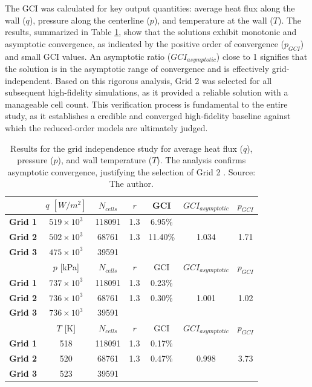 \documentclass[tg, EN]{ufabcFHZh_tg}
\begin{document}
The GCI was calculated for key output quantities: average heat flux along the wall ($q$), pressure along the centerline ($p$), and temperature at the wall ($T$). The results, summarized in Table \ref{tab:grid_independence_results}, show that the solutions exhibit monotonic and asymptotic convergence, as indicated by the positive order of convergence ($p_{GCI}$) and small GCI values. An asymptotic ratio ($GCI_{asymptotic}$) close to 1 signifies that the solution is in the asymptotic range of convergence and is effectively grid-independent. Based on this rigorous analysis, Grid 2 was selected for all subsequent high-fidelity simulations, as it provided a reliable solution with a manageable cell count. This verification process is fundamental to the entire study, as it establishes a credible and converged high-fidelity baseline against which the reduced-order models are ultimately judged.

\begin{table}[H]
\centering
\caption{Results for the grid independence study for average heat flux ($q$), pressure ($p$), and wall temperature ($T$). The analysis confirms asymptotic convergence, justifying the selection of Grid 2 \citep{moreira2023}. Source: The author.}
\label{tab:grid_independence_results}
\begin{tabular}{lcccccc}
\toprule
 & $q$ $[W/m^2]$ & $N_{cells}$ & $r$ & GCI & $GCI_{asymptotic}$ & $p_{GCI}$ \\
\midrule
\textbf{Grid 1} & $519 \times 10^3$ & 118091 & 1.3 & 6.95\% & & \\
\textbf{Grid 2} & $502 \times 10^3$ & 68761 & 1.3 & 11.40\% & 1.034 & 1.71 \\
\textbf{Grid 3} & $475 \times 10^3$ & 39591 & & & & \\
\midrule
 & $p$ [kPa] & $N_{cells}$ & $r$ & GCI & $GCI_{asymptotic}$ & $p_{GCI}$ \\
\midrule
\textbf{Grid 1} & $737 \times 10^3$ & 118091 & 1.3 & 0.23\% & & \\
\textbf{Grid 2} & $736 \times 10^3$ & 68761 & 1.3 & 0.30\% & 1.001 & 1.02 \\
\textbf{Grid 3} & $736 \times 10^3$ & 39591 & & & & \\
\midrule
 & $T$ [K] & $N_{cells}$ & $r$ & GCI & $GCI_{asymptotic}$ & $p_{GCI}$ \\
\midrule
\textbf{Grid 1} & 518 & 118091 & 1.3 & 0.17\% & & \\
\textbf{Grid 2} & 520 & 68761 & 1.3 & 0.47\% & 0.998 & 3.73 \\
\textbf{Grid 3} & 523 & 39591 & & & & \\
\bottomrule
\end{tabular}%
\end{table}
\end{document}
